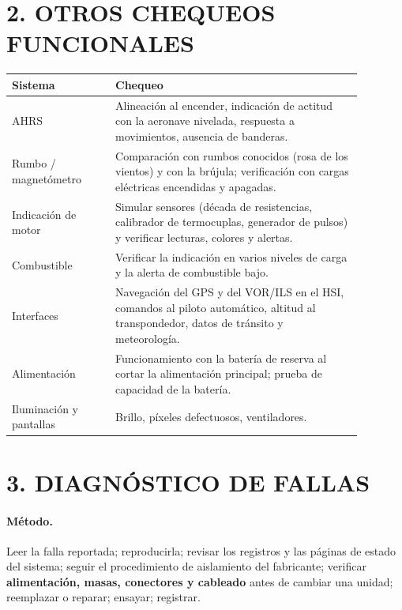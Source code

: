 \section*{2. OTROS CHEQUEOS FUNCIONALES}
\begin{center}
\small
\begin{tabular}{|p{0.26\linewidth}|p{0.62\linewidth}|}
\hline
\textbf{Sistema} & \textbf{Chequeo} \\ \hline
AHRS & Alineación al encender, indicación de actitud con la aeronave nivelada, respuesta a
movimientos, ausencia de banderas. \\ \hline
Rumbo / magnetómetro & Comparación con rumbos conocidos (rosa de los vientos) y con la brújula;
verificación con cargas eléctricas encendidas y apagadas. \\ \hline
Indicación de motor & Simular sensores (década de resistencias, calibrador de termocuplas,
generador de pulsos) y verificar lecturas, colores y alertas. \\ \hline
Combustible & Verificar la indicación en varios niveles de carga y la alerta de combustible
bajo. \\ \hline
Interfaces & Navegación del GPS y del VOR/ILS en el HSI, comandos al piloto automático, altitud al
transpondedor, datos de tránsito y meteorología. \\ \hline
Alimentación & Funcionamiento con la batería de reserva al cortar la alimentación principal; prueba
de capacidad de la batería. \\ \hline
Iluminación y pantallas & Brillo, píxeles defectuosos, ventiladores. \\ \hline
\end{tabular}
\end{center}

\section*{3. DIAGNÓSTICO DE FALLAS}

\paragraph*{Método.} Leer la falla reportada; reproducirla; revisar los registros y las páginas de
estado del sistema; seguir el procedimiento de aislamiento del fabricante; verificar
\textbf{alimentación, masas, conectores y cableado} antes de cambiar una unidad; reemplazar o
reparar; ensayar; registrar.

